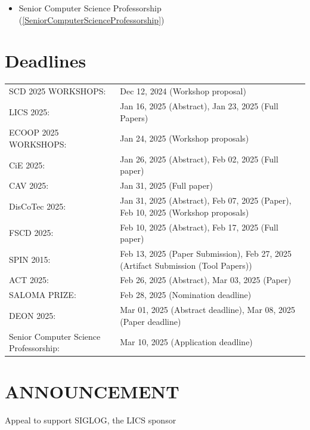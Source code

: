 \documentclass[prodmode,acmtecs]{acmsmall} %
\begin{document}
\begin{itemize}
\begin{itemize}\item Senior Computer Science Professorship (\cref{SeniorComputerScienceProfessorship})
\end{itemize} 
\end{itemize}\section{Deadlines}\label{deadlines}\begin{tabulary}{\linewidth}{LL}SCD 2025 WORKSHOPS:  & Dec 12, 2024 (Workshop proposal) \\
LICS 2025:  & Jan 16, 2025 (Abstract), Jan 23, 2025 (Full Papers) \\
ECOOP 2025 WORKSHOPS:  & Jan 24, 2025 (Workshop proposals) \\
CiE 2025:  & Jan 26, 2025 (Abstract), Feb 02, 2025 (Full paper) \\
CAV 2025:  & Jan 31, 2025 (Full paper) \\
DisCoTec 2025:  & Jan 31, 2025 (Abstract), Feb 07, 2025 (Paper), Feb 10, 2025 (Workshop proposals) \\
FSCD 2025:  & Feb 10, 2025 (Abstract), Feb 17, 2025 (Full paper) \\
SPIN 2015:  & Feb 13, 2025 (Paper Submission), Feb 27, 2025 (Artifact Submission (Tool Papers)) \\
ACT 2025:  & Feb 26, 2025 (Abstract), Mar 03, 2025 (Paper) \\
SALOMA PRIZE:  & Feb 28, 2025 (Nomination deadline) \\
DEON 2025:  & Mar 01, 2025 (Abstract deadline), Mar 08, 2025 (Paper deadline) \\
Senior Computer Science Professorship:  & Mar 10, 2025 (Application deadline) \\
\end{tabulary}
\section{ANNOUNCEMENT}\label{ANNOUNCEMENT}Appeal to support SIGLOG, the LICS sponsor 
\end{document}
